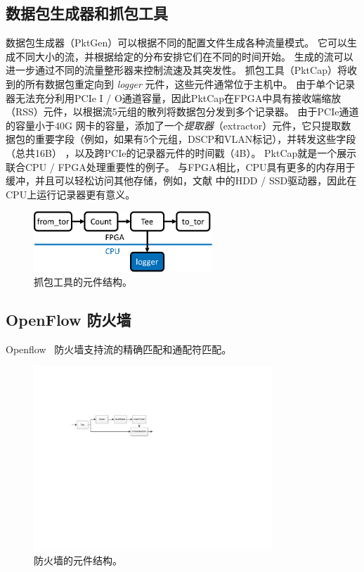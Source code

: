 \subsection{数据包生成器和抓包工具}
数据包生成器（PktGen）可以根据不同的配置文件生成各种流量模式。
它可以生成不同大小的流，并根据给定的分布安排它们在不同的时间开始。
生成的流可以进一步通过不同的流量整形器来控制流速及其突发性。
抓包工具（PktCap）将收到的所有数据包重定向到 \textit {logger} 元件，这些元件通常位于主机中。
由于单个记录器无法充分利用PCIe I / O通道容量，因此PktCap在FPGA中具有接收端缩放（RSS）元件，以根据流5元组的散列将数据包分发到多个记录器。
由于PCIe通道的容量小于40G 网卡的容量，添加了一个\textit {提取器}（extractor）元件，它只提取数据包的重要字段（例如，如果有5个元组，DSCP和VLAN标记），并转发这些字段（总共16B） ，以及跨PCIe的记录器元件的时间戳（4B）。
PktCap就是一个展示联合CPU / FPGA处理重要性的例子。
与FPGA相比，CPU具有更多的内存用于缓冲，并且可以轻松访问其他存储，例如，文献 \cite{lee2015flosis} 中的HDD / SSD驱动器，因此在CPU上运行记录器更有意义。


\begin{figure}[htbp]
	\centering
	\includegraphics[width=0.6\textwidth]{image/packet-capture}
	\caption{抓包工具的元件结构。}
	\label{clicknp:fig:packet-capture}
\end{figure}


\subsection{OpenFlow 防火墙}
Openflow~\cite {mckeown2008openflow} 防火墙支持流的精确匹配和通配符匹配。


\begin{figure}[htbp]
	\centering
	\includegraphics[width=0.8\textwidth]{image/Firewall}
	\caption{防火墙的元件结构。}
	\label{clicknp:fig:firewall-arch}
\end{figure}


